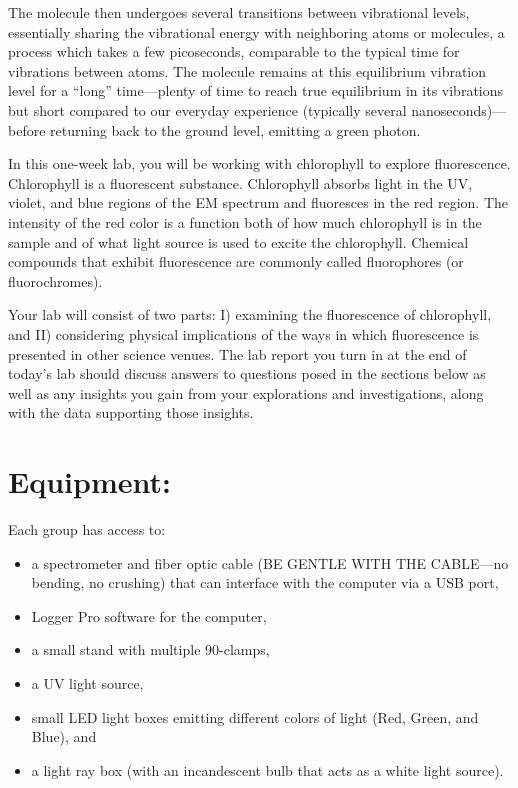 The molecule then undergoes several transitions between vibrational levels, essentially sharing the vibrational energy with neighboring atoms or molecules, a process which takes a few picoseconds, comparable to the typical time for vibrations between atoms.
The molecule remains at this equilibrium vibration level for a “long” time—plenty of time to reach true equilibrium in its vibrations but short compared to our everyday experience (typically several nanoseconds)— before returning back to the ground level, emitting a green photon.
\par 
In this one-week lab, you will be working with chlorophyll to explore fluorescence. 
Chlorophyll is a fluorescent substance. 
Chlorophyll absorbs light in the UV, violet, and blue regions of the EM spectrum and fluoresces in the red region. 
The intensity of the red color is a function both of how much chlorophyll is in the sample and of what light source is used to excite the chlorophyll. 
Chemical compounds that exhibit fluorescence are commonly called fluorophores (or fluorochromes).
\par 
Your lab will consist of two parts: I) examining the fluorescence of chlorophyll, and II) considering physical implications of the ways in which fluorescence is presented in other science venues. 
The lab report you turn in at the end of today's lab should discuss answers to questions posed in the sections below as well as any insights you gain from your explorations and investigations, along with the data supporting those insights.

\section*{Equipment:}
Each group has access to:
\begin{itemize}
\itemsep-0.3em
\item a spectrometer and fiber optic cable (BE GENTLE WITH THE CABLE—no bending, no crushing) that can interface with the computer via a USB port,
\item Logger Pro software for the computer,
\item a small stand with multiple 90-clamps,
\item a UV light source,
\item small LED light boxes emitting different colors of light (Red, Green, and Blue), and
\item a light ray box (with an incandescent bulb that acts as a white light source).
\end{itemize}

